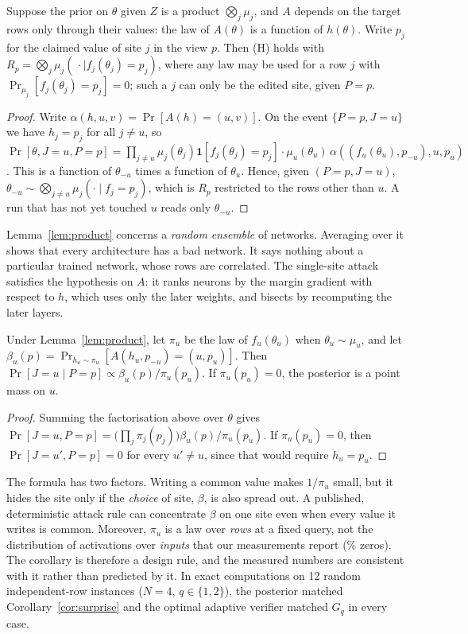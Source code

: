 \begin{lemma}
\label{lem:product}
Suppose the prior on $\theta$ given $Z$ is a product $\bigotimes_j\mu_j$, and $A$ depends on the
target rows only through their values: the law of $A(\theta)$ is a function of $h(\theta)$. Write
$p_j$ for the claimed value of site $j$ in the view $p$. Then (H) holds with
$R_p=\bigotimes_j\mu_j(\,\cdot\mid f_j(\theta_j)=p_j)$, where any law may be used for a row $j$ with
$\Pr_{\mu_j}[f_j(\theta_j)=p_j]=0$; such a $j$ can only be the edited site, given $P=p$.
\end{lemma}
\begin{proof}
Write $\alpha(h,u,v)=\Pr[A(h)=(u,v)]$. On the event $\{P=p,J=u\}$ we have $h_j=p_j$ for all
$j\neq u$, so
$\Pr[\theta,J=u,P=p]=\prod_{j\neq u}\mu_j(\theta_j)\mathbf 1[f_j(\theta_j)=p_j]\cdot
\mu_u(\theta_u)\,\alpha((f_u(\theta_u),p_{-u}),u,p_u)$. This is a function of $\theta_{-u}$ times a
function of $\theta_u$. Hence, given $(P=p,J=u)$, $\theta_{-u}\sim\bigotimes_{j\neq u}
\mu_j(\cdot\mid f_j=p_j)$, which is $R_p$ restricted to the rows other than $u$. A run that has not
yet touched $u$ reads only $\theta_{-u}$.
\end{proof}

\noindent Lemma~\ref{lem:product} concerns a \emph{random ensemble} of networks. Averaging over it
shows that every architecture has a bad network. It says nothing about a particular trained
network, whose rows are correlated. The single-site attack satisfies the hypothesis on $A$: it
ranks neurons by the margin gradient with respect to $h$, which uses only the later weights, and
bisects by recomputing the later layers.

\begin{corollary}
\label{cor:surprise}
Under Lemma~\ref{lem:product}, let $\pi_u$ be the law of $f_u(\theta_u)$ when
$\theta_u\sim\mu_u$, and let $\beta_u(p)=\Pr_{h_u\sim\pi_u}[A(h_u,p_{-u})=(u,p_u)]$. Then
$\Pr[J=u\mid P=p]\propto\beta_u(p)/\pi_u(p_u)$. If $\pi_u(p_u)=0$, the posterior is a point mass
on $u$.
\end{corollary}
\begin{proof}
Summing the factorisation above over $\theta$ gives
$\Pr[J=u,P=p]=\big(\prod_j\pi_j(p_j)\big)\beta_u(p)/\pi_u(p_u)$. If $\pi_u(p_u)=0$, then
$\Pr[J=u',P=p]=0$ for every $u'\neq u$, since that would require $h_u=p_u$.
\end{proof}

\noindent The formula has two factors. Writing a common value makes $1/\pi_u$ small, but it hides
the site only if the \emph{choice} of site, $\beta$, is also spread out. A published,
deterministic attack rule can concentrate $\beta$ on one site even when every value it writes is
common. Moreover, $\pi_u$ is a law over \emph{rows} at a fixed query, not the distribution of
activations over \emph{inputs} that our measurements report (\ZeroingZeroShare{}\% zeros). The corollary is
therefore a design rule, and the measured numbers are consistent with it rather than predicted by
it. In exact computations on 12 random independent-row instances ($N=4$, $q\in\{1,2\}$), the
posterior matched Corollary~\ref{cor:surprise} and the optimal adaptive verifier matched $G_q$ in
every case.

